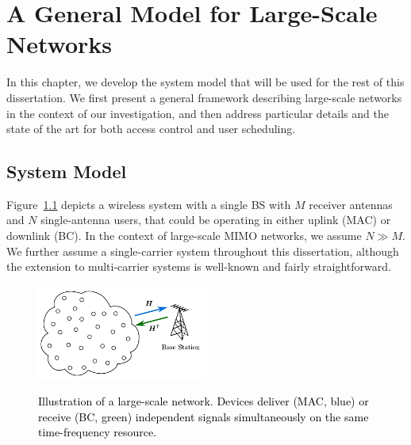 \chapter{A General Model for Large-Scale Networks} \label{system:chap}

In this chapter, we develop the system model that will be used for the rest of this dissertation. We first present a general framework describing large-scale networks in the context of our investigation, and then address particular details and the state of the art for both access control and user scheduling.

\section{System Model}\label{system:sec:model}

Figure~\ref{system:fig:model} depicts a wireless system with a single BS with $M$ receiver antennas and $N$ single-antenna users, that could be operating in either uplink (MAC) or downlink (BC). In the context of large-scale MIMO networks, we assume $N\gg M$. We further assume a single-carrier system throughout this dissertation, although the extension to multi-carrier systems is well-known and fairly straightforward.

\begin{figure}[tbp]
	\centering
	\includegraphics[width=0.5\textwidth]{./figs/system_figs/general_model.pdf}\\
	\caption{\textcolor{black}{Illustration of a large-scale network. Devices deliver (MAC, blue) or receive (BC, green) independent signals simultaneously on the same time-frequency resource.}}\label{system:fig:model}
\end{figure}

